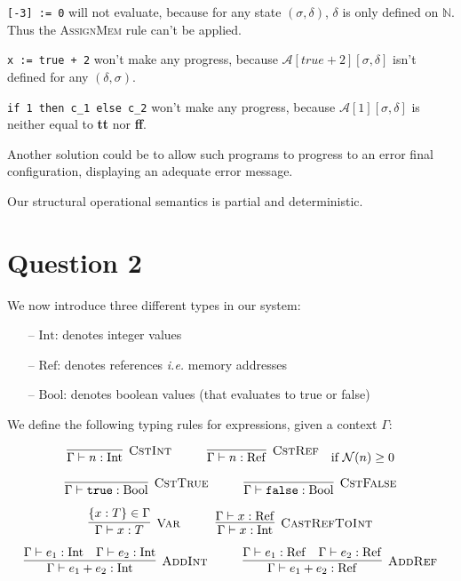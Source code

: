 \documentclass{article}
\newcommand{\Aa}[2]{\mathcal{A}\left[#1\right]\left[#2\right]}
\newcommand{\N}{\mathcal{N}}
\newcommand{\Rule}[3]{\infer[\textsc{#1}]{#2}{#3}}
\newcommand{\Ref}{\mathrm{Ref}}
\newcommand{\Int}{\mathrm{Int}}
\newcommand{\Bool}{\mathrm{Bool}}
\newcommand{\ie}{\emph{i.e.}}
\begin{document}
\texttt{[-3] := 0} will not evaluate, because for any state $(\sigma,\delta)$, $\delta$ is only defined on $\mathbb{N}$. Thus the \textsc{AssignMem} rule can't be applied.

\texttt{x := true + 2} won't make any progress, because $\Aa{true + 2}{\sigma,\delta}$ isn't defined for any $(\delta,\sigma)$.

\texttt{if 1 then c\_1 else c\_2} won't make any progress, because $\Aa{1}{\sigma,\delta}$ is neither equal to \textbf{tt} nor \textbf{ff}.

Another solution could be to allow such programs to progress to an error final configuration, displaying an adequate error message.

Our structural operational semantics is partial and deterministic.

\section*{Question 2}

We now introduce three different types in our system:

\begin{itemize}
	\itemsep0em
	\item[--] $\Int{}$: denotes integer values
	\item[--] $\Ref{}$: denotes references \ie{} memory addresses
	\item[--] $\Bool{}$: denotes boolean values (that evaluates to true or false)
\end{itemize}

We define the following typing rules for expressions, given a context $\Gamma$:

\[
\Rule{CstInt}{\Gamma \vdash n: \Int}{}
\hspace*{1cm}
\Rule{CstRef}{\Gamma \vdash n: \Ref}{} \quad \text{if $\N(n) \geq 0$}
\]

\[
\Rule{CstTrue}{\Gamma \vdash \texttt{true}: \Bool}{}
\hspace*{1cm}
\Rule{CstFalse}{\Gamma \vdash \texttt{false}: \Bool}{}
\]

\[
\Rule{Var}{\Gamma \vdash x: T}{\lbrace x: T \rbrace \in \Gamma}
\hspace*{1cm}
\Rule{CastRefToInt}{\Gamma \vdash x: \Int}{\Gamma \vdash x: \Ref}
\]

\[
\Rule{AddInt}{\Gamma \vdash e_1 + e_2: \Int}{\Gamma \vdash e_1: \Int \quad \Gamma \vdash e_2: \Int}
\hspace*{1cm}
\Rule{AddRef}{\Gamma \vdash e_1 + e_2: \Ref}{\Gamma \vdash e_1: \Ref \quad \Gamma \vdash e_2: \Ref}
\]
\end{document}
